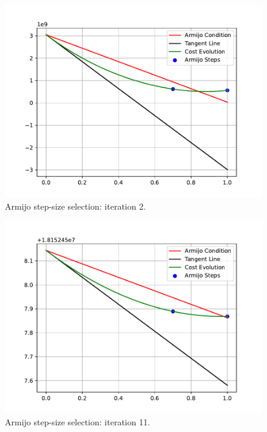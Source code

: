 \begin{figure}[htb]
    \centering
    \includegraphics[width=1\linewidth]{img/1-Task1/Armijo_iter_2.pdf}
    \caption{Armijo step-size selection: iteration 2.}
    \label{fig:armijo2}
\end{figure}

\begin{figure}[htb]
    \centering
    \includegraphics[width=1\linewidth]{img/1-Task1/Armijo_iter_11.pdf}
    \caption{Armijo step-size selection: iteration 11.}
    \label{fig:armijo11}
\end{figure}

